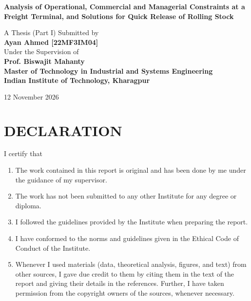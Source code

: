 \documentclass[12pt,a4paper]{report}
\begin{document}

\begin{titlepage}
    \centering
    \vspace*{2cm}
    {\Huge\bfseries Analysis of Operational, Commercial and Managerial Constraints at a Freight Terminal, and Solutions for Quick Release of Rolling Stock\\[1cm]}

    \vspace{1.5cm}
    {\Large A Thesis (Part I) Submitted by\\[0.3cm]
    \textbf{Ayan Ahmed [22MF3IM04]}\\[0.2cm]
    Under the Supervision of\\[0.5cm]
    \textbf{Prof. Biswajit Mahanty}\\[0.7cm]
    \textbf{Master of Technology in Industrial and Systems Engineering}\\[0.5cm]
    \textbf{Indian Institute of Technology, Kharagpur}}

    \vfill
    \Large {12 November 2026}
\end{titlepage}

\newpage
\thispagestyle{empty}
\section*{DECLARATION}
\noindent I certify that
\begin{enumerate}[leftmargin=2em, itemsep=4pt]
    \item The work contained in this report is original and has been done by me under the guidance of my supervisor.
    \item The work has not been submitted to any other Institute for any degree or diploma.
    \item I followed the guidelines provided by the Institute when preparing the report.
    \item I have conformed to the norms and guidelines given in the Ethical Code of Conduct of the Institute.
    \item Whenever I used materials (data, theoretical analysis, figures, and text) from other sources, I gave due credit to them by citing them in the text of the report and giving their details in the references. Further, I have taken permission from the copyright owners of the sources, whenever necessary.
\end{enumerate}
\end{document}
